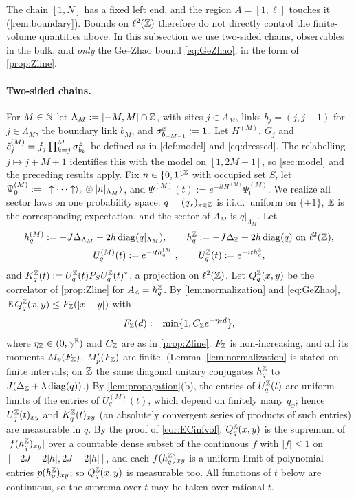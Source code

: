 The chain $[1,N]$ has a fixed left end, and the region $A=[1,\ell]$ touches it (\cref{rem:boundary}).  Bounds on
$\ell^2(\mathbb{Z})$ therefore do not directly control the finite-volume quantities above.  In this subsection we use
two-sided chains, observables in the bulk, and \emph{only} the Ge--Zhao bound \eqref{eq:GeZhao}, in the form of
\cref{prop:Zline}.

\paragraph{Two-sided chains.}
For $M\in\mathbb{N}$ let $\Lambda_M:=[-M,M]\cap\mathbb{Z}$, with sites $j\in\Lambda_M$, links $b_j=(j,j+1)$ for $j\in\Lambda_M$, the
boundary link $b_M$, and $\sigma^x_{b_{-M-1}}:=\mathbf{1}$.  Let $H^{(M)}$, $G_j$ and $\tilde c^{(M)}_j=f_j\prod_{k=j}^M\sigma^z_{b_k}$ be
defined as in \cref{def:model} and \eqref{eq:dressed}.  The relabelling $j\mapsto j+M+1$ identifies this with the model
on $[1,2M+1]$, so \cref{sec:model} and the preceding results apply.  Fix $n\in\{0,1\}^{\mathbb{Z}}$ with occupied set $S$, let
$\Psi^{(M)}_0:=|\uparrow\cdots\uparrow\rangle_z\otimes|n|_{\Lambda_M}\rangle$, and $\Psi^{(M)}(t):=e^{-itH^{(M)}}\Psi^{(M)}_0$.  We
realize all sector laws on one probability space: $q=(q_x)_{x\in\mathbb{Z}}$ is i.i.d.\ uniform on $\{\pm1\}$, $\mathbb{E}$ is the
corresponding expectation, and the sector of $\Lambda_M$ is $q|_{\Lambda_M}$.  Let
\begin{gather*}
  h^{(M)}_q:=-J\Delta_{\Lambda_M}+2h\operatorname{diag}(q|_{\Lambda_M}),\qquad h^{\mathbb{Z}}_q:=-J\Delta_{\mathbb{Z}}+2h\operatorname{diag}(q)\ \text{on }\ell^2(\mathbb{Z}),\\
  U^{(M)}_q(t):=e^{-ith^{(M)}_q},\qquad U^{\mathbb{Z}}_q(t):=e^{-ith^{\mathbb{Z}}_q},
\end{gather*}
and $K^{\mathbb{Z}}_q(t):=U^{\mathbb{Z}}_q(t)P_SU^{\mathbb{Z}}_q(t)^*$, a projection on $\ell^2(\mathbb{Z})$.  Let $Q^{\mathbb{Z}}_q(x,y)$ be the correlator of
\cref{prop:Zline} for $A_{\mathbb{Z}}=h^{\mathbb{Z}}_q$.  By \cref{lem:normalization} and \eqref{eq:GeZhao},
$\mathbb{E}\,Q^{\mathbb{Z}}_q(x,y)\le F_{\mathbb{Z}}(|x-y|)$ with
\[
  F_{\mathbb{Z}}(d):=\min\{1,C_{\mathbb{Z}} e^{-\eta_{\mathbb{Z}} d}\},
\]
where $\eta_{\mathbb{Z}}\in(0,\gamma^{\mathbb{E}})$ and $C_{\mathbb{Z}}$ are as in \cref{prop:Zline}.  $F_{\mathbb{Z}}$ is non-increasing, and all its moments
$M_p(F_{\mathbb{Z}})$, $M'_p(F_{\mathbb{Z}})$ are finite.  (Lemma~\ref{lem:normalization} is stated on finite intervals; on $\mathbb{Z}$ the same
diagonal unitary conjugates $h^{\mathbb{Z}}_q$ to $J(\Delta_{\mathbb{Z}}+\lambda\operatorname{diag}(q))$.)  By \cref{lem:propagation}(b), the entries of
$U^{\mathbb{Z}}_q(t)$ are uniform limits of the entries of $U^{(M)}_q(t)$, which depend on finitely many $q_x$; hence
$U^{\mathbb{Z}}_q(t)_{xy}$ and $K^{\mathbb{Z}}_q(t)_{xy}$ (an absolutely convergent series of products of such entries) are measurable
in $q$.  By the
proof of \cref{cor:ECinfvol}, $Q^{\mathbb{Z}}_q(x,y)$ is the supremum of $|f(h^{\mathbb{Z}}_q)_{xy}|$ over a countable dense subset of the
continuous $f$ with $|f|\le1$ on $[-2J-2|h|,2J+2|h|]$, and each $f(h^{\mathbb{Z}}_q)_{xy}$ is a uniform limit of polynomial
entries $p(h^{\mathbb{Z}}_q)_{xy}$; so $Q^{\mathbb{Z}}_q(x,y)$ is measurable too.  All functions of $t$ below are continuous, so the suprema
over $t$ may be taken over rational $t$.

